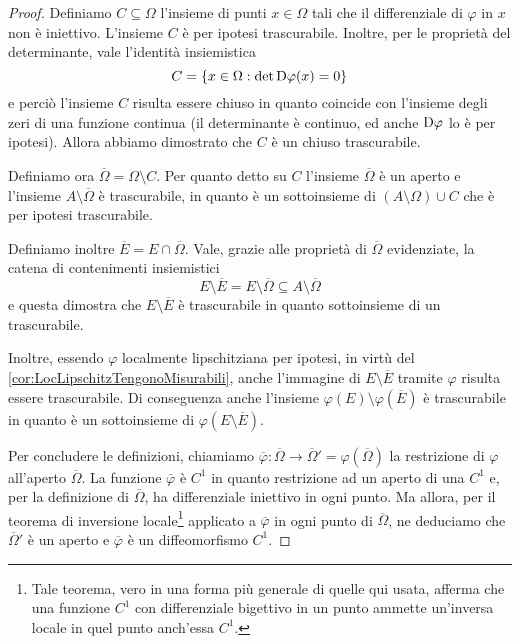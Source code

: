 \begin{proof}
	Definiamo $C\subseteq\Omega$ l'insieme di punti $x\in\Omega$ tali che il differenziale di $\varphi$ in $x$ non è iniettivo. 
	L'insieme $C$ è per ipotesi trascurabile.
	Inoltre, per le proprietà del determinante, vale l'identità insiemistica
	\begin{equation*}
		C=\left\{x\in\Omega:\det \mathrm D \varphi(x)=0\right\}
	\end{equation*}
	e perciò l'insieme $C$ risulta essere chiuso in quanto coincide con l'insieme degli zeri di una funzione continua (il determinante è continuo, ed anche $\mathrm D \varphi$ lo è per ipotesi).
	Allora abbiamo dimostrato che $C$ è un chiuso trascurabile.
	
	Definiamo ora $\overline\Omega=\Omega\setminus C$. 
	Per quanto detto su $C$ l'insieme $\overline\Omega$ è un aperto e l'insieme $A\setminus\overline\Omega$ è trascurabile, in quanto è un sottoinsieme di $(A\setminus\Omega)\cup C$ che è per ipotesi trascurabile.
	
	Definiamo inoltre $\overline E=E\cap\overline\Omega$. 
	Vale, grazie alle proprietà di $\overline\Omega$ evidenziate, la catena di contenimenti insiemistici
	\begin{equation*}
		E\setminus\overline E=E\setminus\overline\Omega\subseteq A\setminus\overline\Omega
	\end{equation*}
	e questa dimostra che $E\setminus\overline E$ è trascurabile in quanto sottoinsieme di un trascurabile.
	
	Inoltre, essendo $\varphi$ localmente lipschitziana per ipotesi, in virtù del \cref{cor:LocLipschitzTengonoMisurabili}, anche l'immagine di $E\setminus\overline E$ tramite $\varphi$ risulta essere trascurabile. Di conseguenza anche l'insieme $\varphi(E)\setminus\varphi(\overline E)$ è trascurabile in quanto è un sottoinsieme di $\varphi(E\setminus\overline E)$.
	
	Per concludere le definizioni, chiamiamo $\overline\varphi:\overline\Omega\to\overline\Omega'=\varphi(\overline\Omega)$ la restrizione di $\varphi$ all'aperto $\overline\Omega$.
	La funzione $\overline\varphi$ è $C^1$ in quanto restrizione ad un aperto di una $C^1$ e, per la definizione di $\overline\Omega$, ha differenziale iniettivo in ogni punto.
	Ma allora, per il teorema di inversione locale\footnote{Tale teorema, vero in una forma più generale di quelle qui usata, afferma che una funzione $C^1$ con differenziale bigettivo in un punto ammette un'inversa locale in quel punto anch'essa $C^1$.} applicato a $\overline\varphi$ in ogni punto di $\overline\Omega$, ne deduciamo che $\overline\Omega'$ è un aperto e $\overline\varphi$ è un diffeomorfismo $C^1$.
	

\end{proof}
